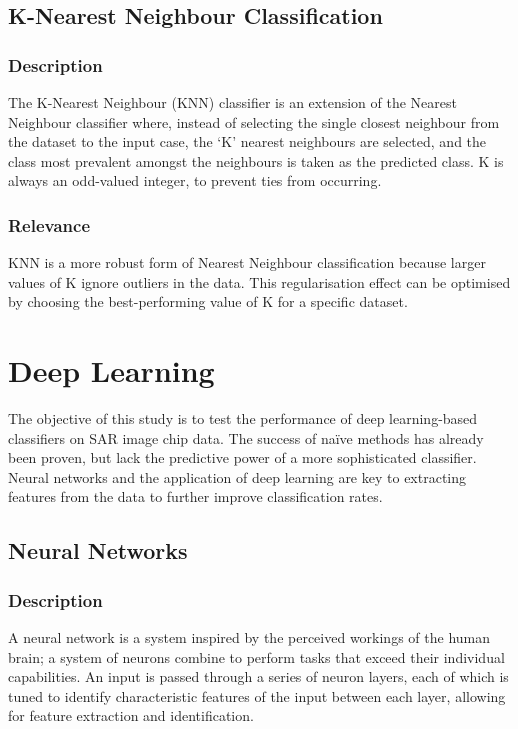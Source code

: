 \subsection{K-Nearest Neighbour Classification}\label{lit:knn}
\subsubsection{Description}
The K-Nearest Neighbour (KNN) classifier is an extension of the Nearest Neighbour classifier where, instead of selecting the single closest neighbour from the dataset to the input case, the `K' nearest neighbours are selected, and the class most prevalent amongst the neighbours is taken as the predicted class. K is always an odd-valued integer, to prevent ties from occurring. 

\subsubsection{Relevance}
KNN is a more robust form of Nearest Neighbour classification because larger values of K ignore outliers in the data. This regularisation effect can be optimised by choosing the best-performing value of K for a specific dataset.

\section{Deep Learning}

The objective of this study is to test the performance of deep learning-based classifiers on SAR image chip data. The success of na{\"i}ve methods has already been proven\cite{Schumacher_atrof}, but lack the predictive power of a more sophisticated classifier. Neural networks and the application of deep learning are key to extracting features from the data to further improve classification rates.

\subsection{Neural Networks}
\subsubsection{Description}
A neural network is a system inspired by the perceived workings of the human brain; a system of neurons combine to perform tasks that exceed their individual capabilities. An input is passed through a series of neuron layers, each of which is tuned to identify characteristic features of the input between each layer, allowing for feature extraction and identification. 

